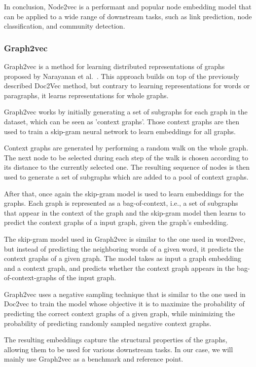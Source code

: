 In conclusion, Node2vec is a performant and popular node embedding model that can be applied to a wide range of downstream tasks, such as link prediction, node classification, and community detection.

\subsubsection{Graph2vec}
Graph2vec is a method for learning distributed representations of graphs proposed by Narayanan et al.~\cite{2017graph2vec}. This approach builds on top of the previously described Doc2Vec method, but contrary to learning representations for words or paragraphs, it learns representations for whole graphs.

Graph2vec works by initially generating a set of subgraphs for each graph in the dataset, which can be seen as 'context graphs'. Those context graphs are then used to train a skip-gram neural network to learn embeddings for all graphs.

Context graphs are generated by performing a random walk on the whole graph. The next node to be selected during each step of the walk is chosen according to its distance to the currently selected one. The resulting sequence of nodes is then used to generate a set of subgraphs which are added to a pool of context graphs.

After that, once again the skip-gram model is used to learn embeddings for the graphs. Each graph is represented as a bag-of-context, i.e., a set of subgraphs that appear in the context of the graph and the skip-gram model then learns to predict the context graphs of a input graph, given the graph's embedding.

The skip-gram model used in Graph2vec is similar to the one used in word2vec, but instead of predicting the neighboring words of a given word, it predicts the context graphs of a given graph. The model takes as input a graph embedding and a context graph, and predicts whether the context graph appears in the bag-of-context-graphs of the input graph.

Graph2vec uses a negative sampling technique that is similar to the one used in Doc2vec to train the model whose objective it is to maximize the probability of predicting the correct context graphs of a given graph, while minimizing the probability of predicting randomly sampled negative context graphs.

The resulting embeddings capture the structural properties of the graphs, allowing them to be used for various downstream tasks. In our case, we will mainly use Graph2vec as a benchmark and reference point.

